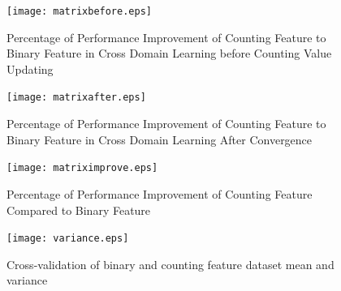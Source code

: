 \documentclass{sig-alternate}
\begin{document}
\begin{figure}[t]
\centering
\texttt{[image: matrixbefore.eps]}
\caption{Percentage of Performance Improvement of Counting Feature to Binary Feature in Cross Domain Learning before Counting Value Updating}
\label{fig:matrixbefore}
\end{figure}

\begin{figure}[t]
\centering
\texttt{[image: matrixafter.eps]}
\caption{Percentage of Performance Improvement of Counting Feature to Binary Feature in Cross Domain Learning After Convergence}
\label{fig:matrixafter}
\end{figure}

\begin{figure}[t]
\centering
\texttt{[image: matriximprove.eps]}
\caption{Percentage of Performance Improvement of Counting Feature Compared to Binary Feature}
\label{fig:matriximprove}
\end{figure}


\begin{figure}[t]
\centering
\texttt{[image: variance.eps]}
\caption{Cross-validation of binary and counting feature dataset mean and variance}
\label{fig:variance}
\end{figure}




\end{document}
